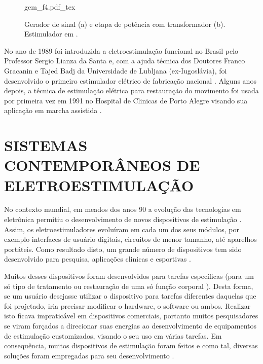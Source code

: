 \vspace{0.3cm}
\begin{figure}[h]
    \centering %
    \small %
    \def\svgwidth{0.9\columnwidth}%
    {gem_f4.pdf_tex}
    \caption{Gerador de sinal (a) e etapa de potência com transformador (b). Estimulador em  \cite{Phillips1980}.}
    \label{fig:gem_f4}
\end{figure}

No ano de 1989 foi introduzida a eletroestimulação funcional no Brasil pelo Professor Sergio Lianza da Santa e, com a ajuda técnica dos Doutores Franco Gracanin e Tajed Badj da Universidade de Lubljana (ex-Iugoslávia), foi desenvolvido o primeiro estimulador elétrico de fabricação nacional \cite{Santos1995}. Alguns anos depois, a técnica de estimulação elétrica para restauração do movimento foi usada por primeira vez em 1991 no Hospital de Clinicas de Porto Alegre visando sua aplicação em marcha assistida \cite{Santos1995}.

\section{SISTEMAS CONTEMPORÂNEOS DE ELETROESTIMULAÇÃO}

No contexto mundial, em meados dos anos 90 a evolução das tecnologias em eletrônica permitiu o desenvolvimento de novos dispositivos de estimulação \cite{Wu2002}. Assim, os eletroestimuladores evoluíram em cada um dos seus módulos, por exemplo interfaces de usuário digitais, circuitos de menor tamanho, até aparelhos portáteis. Como resultado disto, um grande número de dispositivos tem sido desenvolvido para pesquisa, aplicações clinicas e esportivas \cite{Popovic2004}.

Muitos desses dispositivos foram desenvolvidos para tarefas específicas (para um só tipo de tratamento ou restauração de uma só função corporal \cite{Brunetti2011,Souza2017}).  %
Desta forma, se um usuário desejasse utilizar o dispositivo para tarefas diferentes daquelas que foi projetado, iria precisar modificar o hardware, o software ou ambos. Realizar isto ficava impraticável em dispositivos comerciais, portanto muitos pesquisadores se viram forçados a direcionar suas energias ao desenvolvimento de equipamentos de estimulação customizados, visando o seu uso em várias tarefas. Em consequência, muitos dispositivos de estimulação foram feitos e como tal, diversas soluções foram empregadas para seu desenvolvimento \cite{Ilic1994, Popovic2001}. %

